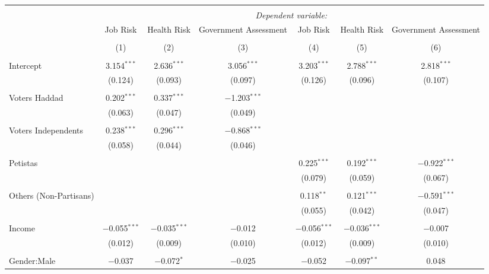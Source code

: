 
\begin{table}[!htbp] \centering 
  \caption{} 
  \label{} 
\begin{tabular}{@{\extracolsep{5pt}}lcccccc} 
\\[-1.8ex]\hline 
\hline \\[-1.8ex] 
 & \multicolumn{6}{c}{\textit{Dependent variable:}} \\ 
\cline{2-7} 
 & Job Risk & Health Risk & Government Assessment & Job Risk & Health Risk & Government Assessment \\ 
\\[-1.8ex] & (1) & (2) & (3) & (4) & (5) & (6)\\ 
\hline \\[-1.8ex] 
 Intercept & 3.154$^{***}$ & 2.636$^{***}$ & 3.056$^{***}$ & 3.203$^{***}$ & 2.788$^{***}$ & 2.818$^{***}$ \\ 
  & (0.124) & (0.093) & (0.097) & (0.126) & (0.096) & (0.107) \\ 
  & & & & & & \\ 
 Voters Haddad & 0.202$^{***}$ & 0.337$^{***}$ & $-$1.203$^{***}$ &  &  &  \\ 
  & (0.063) & (0.047) & (0.049) &  &  &  \\ 
  & & & & & & \\ 
 Voters Independents & 0.238$^{***}$ & 0.296$^{***}$ & $-$0.868$^{***}$ &  &  &  \\ 
  & (0.058) & (0.044) & (0.046) &  &  &  \\ 
  & & & & & & \\ 
 Petistas &  &  &  & 0.225$^{***}$ & 0.192$^{***}$ & $-$0.922$^{***}$ \\ 
  &  &  &  & (0.079) & (0.059) & (0.067) \\ 
  & & & & & & \\ 
 Others (Non-Partisans) &  &  &  & 0.118$^{**}$ & 0.121$^{***}$ & $-$0.591$^{***}$ \\ 
  &  &  &  & (0.055) & (0.042) & (0.047) \\ 
  & & & & & & \\ 
 Income & $-$0.055$^{***}$ & $-$0.035$^{***}$ & $-$0.012 & $-$0.056$^{***}$ & $-$0.036$^{***}$ & $-$0.007 \\ 
  & (0.012) & (0.009) & (0.010) & (0.012) & (0.009) & (0.010) \\ 
  & & & & & & \\ 
 Gender:Male & $-$0.037 & $-$0.072$^{*}$ & $-$0.025 & $-$0.052 & $-$0.097$^{**}$ & 0.048 \\ 

\end{tabular}
\end{table}
